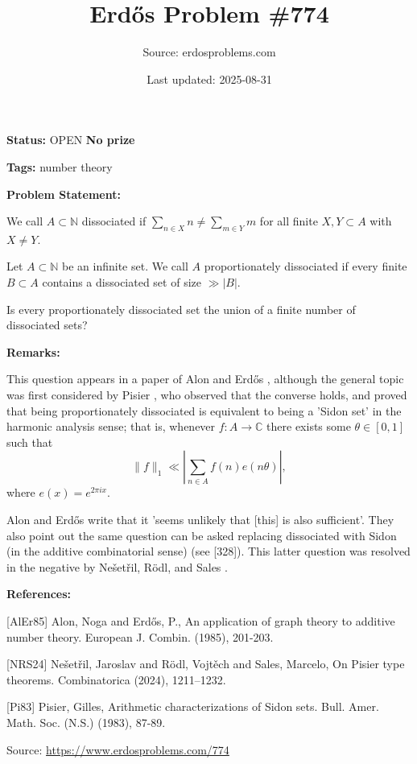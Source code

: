 \documentclass{article}
\title{Erd\H{o}s Problem \#774}
\date{Last updated: 2025-08-31}
\author{Source: erdosproblems.com}
\begin{document}
\maketitle

\noindent\textbf{Status:} OPEN \quad \textbf{No prize}

\noindent\textbf{Tags:} number theory

\medskip
\noindent\textbf{Problem Statement:}

We call $A\subset \mathbb{N}$ dissociated if $\sum_{n\in X}n\neq \sum_{m\in Y}m$ for all finite $X,Y\subset A$ with $X\neq Y$. 

Let $A\subset \mathbb{N}$ be an infinite set. We call $A$ proportionately dissociated if every finite $B\subset A$ contains a dissociated set of size $\gg \lvert B\rvert$.

Is every proportionately dissociated set the union of a finite number of dissociated sets?

\bigskip
\noindent\textbf{Remarks:}

This question appears in a paper of Alon and Erd\H{o}s \cite{AlEr85}, although the general topic was first considered by Pisier \cite{Pi83}, who observed that the converse holds, and proved that being proportionately dissociated is equivalent to being a 'Sidon set' in the harmonic analysis sense; that is, whenever $f:A\to \mathbb{C}$ there exists some $\theta\in [0,1]$ such that\[\| f\|_1 \ll \left\lvert\sum_{n\in A} f(n)e(n\theta)\right\rvert,\]where $e(x)=e^{2\pi ix}$. 

Alon and Erd\H{o}s write that it 'seems unlikely that [this] is also sufficient'. They also point out the same question can be asked replacing dissociated with Sidon (in the additive combinatorial sense) (see [328]). This latter question was resolved in the negative by Ne\v{s}et\v{r}il, R\"{o}dl, and Sales \cite{NRS24}.

\bigskip
\noindent\textbf{References:}

[AlEr85] Alon, Noga and Erd\H{o}s, P., An application of graph theory to additive number theory. European J. Combin. (1985), 201-203.
 
 [NRS24] Ne\v set\v ril, Jaroslav and R\"odl, Vojt\v ech and Sales,
Marcelo, On {P}isier type theorems. Combinatorica (2024), 1211--1232.
 
 [Pi83] Pisier, Gilles, Arithmetic characterizations of Sidon sets. Bull. Amer. Math. Soc. (N.S.) (1983), 87-89.

\bigskip
\noindent\small{Source: \url{https://www.erdosproblems.com/774}}
\end{document}
